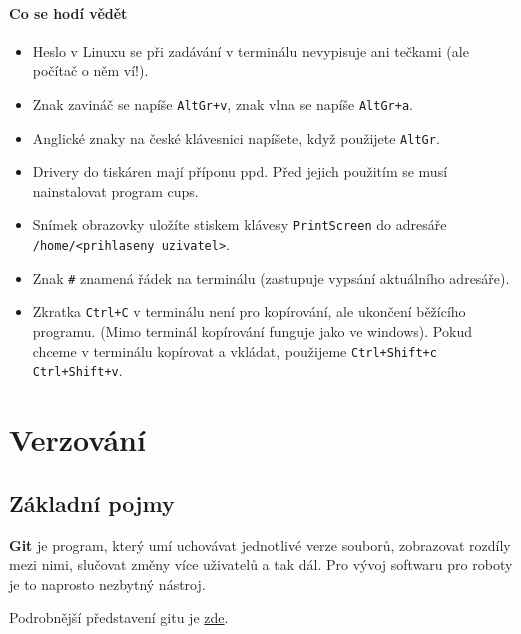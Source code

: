 \paragraph{Co se hodí vědět }

\begin{itemize}
	
	
\item Heslo v Linuxu se při zadávání v terminálu nevypisuje ani tečkami (ale počítač o něm ví!). 

\item Znak zavináč se napíše {\tt AltGr+v}, znak vlna se napíše {\tt AltGr+a}.

\item Anglické znaky na české klávesnici napíšete, když použijete {\tt AltGr}. 

\item Drivery do tiskáren mají příponu ppd. Před jejich použitím se musí nainstalovat program cups. 

\item Snímek obrazovky uložíte stiskem klávesy {\tt PrintScreen} do adresáře 
{\tt /home/<prihlaseny uzivatel>}. 

\item Znak {\tt \#} znamená řádek na terminálu (zastupuje vypsání aktuálního adresáře). 

\item Zkratka {\tt Ctrl+C} v terminálu není pro kopírování, ale ukončení běžícího programu. (Mimo terminál kopírování funguje jako ve windows). Pokud chceme v terminálu kopírovat a vkládat, použijeme {\tt Ctrl+Shift+c}  {\tt Ctrl+Shift+v}.

	
\end{itemize}


\section{Verzování} 


\subsection{Základní pojmy}

{\bf Git} je program, který umí uchovávat jednotlivé verze souborů, zobrazovat rozdíly mezi nimi, slučovat změny více uživatelů a tak dál. Pro vývoj softwaru pro roboty je to naprosto nezbytný nástroj. 

Podrobnější představení gitu je  \href{http://www.kutac.cz/blog/pocitace-a-internety/jak-na-git-dil-0-co-proc-jak/}{zde}.

